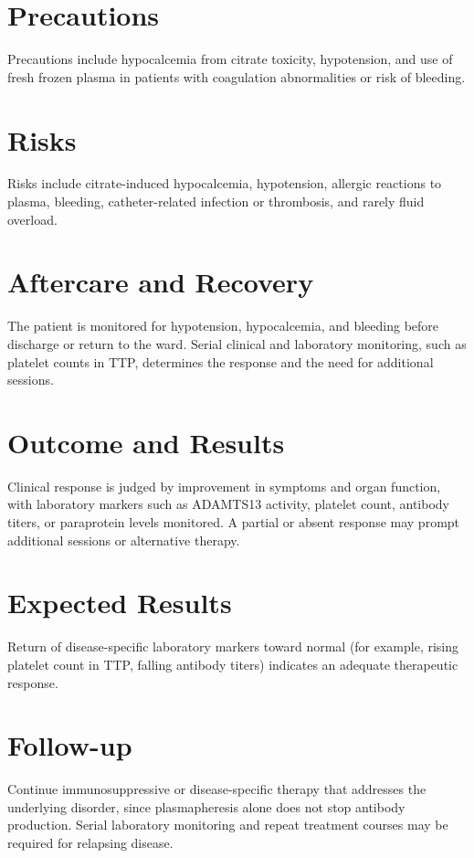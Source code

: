 \section*{Precautions}
Precautions include hypocalcemia from citrate toxicity, hypotension, and use of fresh frozen plasma in patients with coagulation abnormalities or risk of bleeding.

\section*{Risks}
Risks include citrate-induced hypocalcemia, hypotension, allergic reactions to plasma, bleeding, catheter-related infection or thrombosis, and rarely fluid overload.

\section*{Aftercare and Recovery}
The patient is monitored for hypotension, hypocalcemia, and bleeding before discharge or return to the ward. Serial clinical and laboratory monitoring, such as platelet counts in TTP, determines the response and the need for additional sessions.

\section*{Outcome and Results}
Clinical response is judged by improvement in symptoms and organ function, with laboratory markers such as ADAMTS13 activity, platelet count, antibody titers, or paraprotein levels monitored. A partial or absent response may prompt additional sessions or alternative therapy.

\section*{Expected Results}
Return of disease-specific laboratory markers toward normal (for example, rising platelet count in TTP, falling antibody titers) indicates an adequate therapeutic response.

\section*{Follow-up}
Continue immunosuppressive or disease-specific therapy that addresses the underlying disorder, since plasmapheresis alone does not stop antibody production. Serial laboratory monitoring and repeat treatment courses may be required for relapsing disease.

